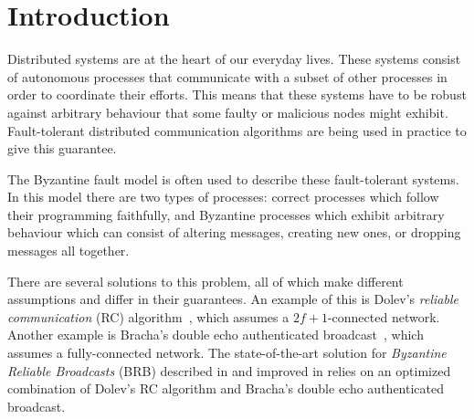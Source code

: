 \section{Introduction}








Distributed systems are at the heart of our everyday lives. These systems consist of autonomous processes that communicate with a subset of other processes in order to coordinate their efforts. This means that these systems have to be robust against arbitrary behaviour that some faulty or malicious nodes might exhibit. Fault-tolerant distributed communication algorithms are being used in practice to give this guarantee. 

The Byzantine fault model is often used to describe these fault-tolerant systems. In this model there are two types of processes: correct processes which follow their programming faithfully, and Byzantine processes which exhibit arbitrary behaviour which can consist of altering messages, creating new ones, or dropping messages all together.

There are several solutions to this problem, all of which make different assumptions and differ in their guarantees. An example of this is Dolev's \textit{reliable communication} (RC) algorithm~\cite{dolev}, which assumes a $2f+1$-connected network. Another example is Bracha's double echo authenticated broadcast~\cite{bracha}, which assumes a fully-connected network. The state-of-the-art solution for \textit{Byzantine Reliable Broadcasts} (BRB) described in \cite{bracha-dolev} and improved in \cite{bonomi2021practical} relies on an optimized combination of Dolev's RC algorithm \cite{bonomi2019multihop} and Bracha's double echo authenticated broadcast.

